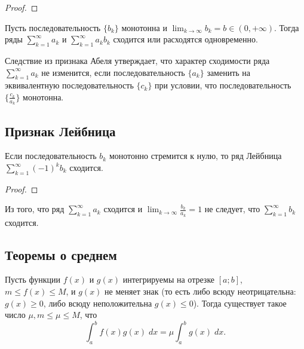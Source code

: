 	\begin{proof}
	\end{proof}
	
	\begin{corollary}
		Пусть последовательность $\{b_k\}$ монотонна и $\displaystyle \lim_{k \to \infty} {b_k} = b \in (0, +\infty)$. Тогда ряды $\displaystyle \sum_{k = 1}^{\infty} a_k$ и $\displaystyle \sum_{k = 1}^{\infty} a_k b_k$ сходится или расходятся одновременно.
	\end{corollary}
	
	\begin{mention}
		Следствие из признака Абеля утверждает, что характер
		сходимости ряда $\sum_{k = 1}^{\infty} {a_k}$ не изменится, если последовательность $\{a_k\}$ заменить на эквивалентную последовательность $\{c_k\}$ при условии, что последовательность $\{\frac{c_k}{a_k}\}$ монотонна.
	\end{mention}
	
	\subsection{Признак Лейбница}
	
	\begin{theorem}
		Если последовательность ${b_k}$ монотонно стремится к нулю, то
		ряд Лейбница $\displaystyle \sum_{k = 1}^{\infty} (-1)^k b_k$ сходится.
	\end{theorem}
	
	\begin{proof}
	\end{proof}
	
	\begin{mention}
		Из того, что ряд $\displaystyle \sum_{k = 1}^{\infty} {a_k}$ сходится и $\displaystyle \lim_{k \to \infty} {\frac{b_k}{a_k}} = 1$ не следует, что $\displaystyle \sum_{k = 1}^{\infty} {b_k}$ сходится.
	\end{mention}
	
    \subsection{Теоремы о среднем}
    
    \begin{theorem}
    	Пусть функции $f(x)$ и $g(x)$ интегрируемы на отрезке $[a; b]$,
    	$m \leqslant f(x) \leqslant M$, и $g(x)$ не меняет знак (то есть либо всюду неотрицательна: $g(x) \geqslant 0$, либо всюду неположительна $g(x) \leqslant 0$). Тогда существует такое число $\mu, m \leqslant \mu \leqslant M$, что
    	\[ \int_a^b f(x)g(x) \; dx = \mu \int_a^b g(x) \; dx. \]
    \end{theorem}
    
